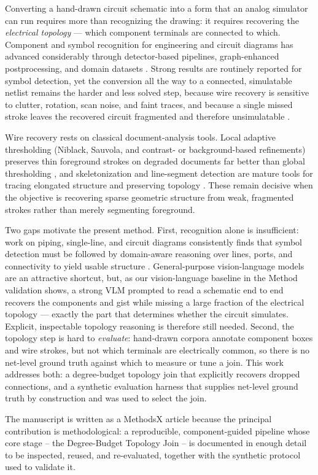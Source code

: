 Converting a hand-drawn circuit schematic into a form that an analog simulator can
run requires more than recognizing the drawing: it requires recovering the
\emph{electrical topology} --- which component terminals are connected to which.
Component and symbol recognition for engineering and circuit diagrams has advanced
considerably through detector-based pipelines, graph-enhanced postprocessing, and
domain datasets \cite{Thoma2021,Rachala2022,Shen2023,Schaefer2021,Elyan2020,Lee2020,Yang2024,Hemker2024,MorenoGarcia2024}.
Strong results are routinely reported for symbol detection, yet the conversion all
the way to a connected, simulatable netlist remains the harder and less solved
step, because wire recovery is sensitive to clutter, rotation, scan noise, and
faint traces, and because a single missed stroke leaves the recovered circuit
fragmented and therefore unsimulatable \cite{Rabby2019,Shen2023,Hemker2024}.

Wire recovery rests on classical document-analysis tools. Local adaptive
thresholding (Niblack, Sauvola, and contrast- or background-based refinements)
preserves thin foreground strokes on degraded documents far better than global
thresholding \cite{Otsu1979,Niblack1986,Sauvola2000,Gatos2006,Shafait2008,Su2013},
and skeletonization and line-segment detection are mature tools for tracing
elongated structure and preserving topology \cite{ZhangSuen1984,Lam1992,DudaHart1972,Gioi2010}.
These remain decisive when the objective is recovering sparse geometric structure
from weak, fragmented strokes rather than merely segmenting foreground.

Two gaps motivate the present method. First, recognition alone is insufficient:
work on piping, single-line, and circuit diagrams consistently finds that symbol
detection must be followed by domain-aware reasoning over lines, ports, and
connectivity to yield usable structure \cite{Elyan2020,Lee2020,Yang2024,Hemker2024,Rachala2022}.
General-purpose vision-language models are an attractive shortcut, but, as our
vision-language baseline in the Method validation shows, a strong VLM prompted to
read a schematic end to end recovers the components and gist while missing a large
fraction of the electrical topology ---
exactly the part that determines whether the circuit simulates. Explicit,
inspectable topology reasoning is therefore still needed. Second, the topology step
is hard to \emph{evaluate}: hand-drawn corpora annotate component boxes and wire
strokes, but not which terminals are electrically common, so there is no net-level
ground truth against which to measure or tune a join. This work addresses both: a
degree-budget topology join that explicitly recovers dropped connections, and a
synthetic evaluation harness that supplies net-level ground truth by construction
and was used to select the join.

The manuscript is written as a MethodsX article because the principal contribution
is methodological: a reproducible, component-guided pipeline whose core stage --
the Degree-Budget Topology Join -- is documented in enough detail to be inspected,
reused, and re-evaluated, together with the synthetic protocol used to validate it.
